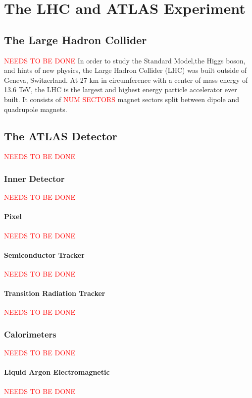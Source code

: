 \chapter{The LHC and ATLAS Experiment}

\section{The Large Hadron Collider}{
	\textcolor{red}{NEEDS TO BE DONE}
}
	In order to study the Standard Model,the Higgs boson, and hints of new physics, the Large Hadron Collider (LHC) was built outside of Geneva, Switzerland. At 27 km in circumference with a center of mass energy of 13.6 TeV, the LHC is the largest and highest energy particle accelerator ever built. It consists of \textcolor{red}{NUM SECTORS} magnet sectors split between dipole and quadrupole magnets.

\section{The ATLAS Detector}{
	\textcolor{red}{NEEDS TO BE DONE}  ~\cite{atlas-experiment}
}

	\subsection{Inner Detector}{
		\textcolor{red}{NEEDS TO BE DONE}
	}

		\subsubsection{Pixel}{
			\textcolor{red}{NEEDS TO BE DONE}
		}

		\subsubsection{Semiconductor Tracker}{
			\textcolor{red}{NEEDS TO BE DONE}
		}

		\subsubsection{Transition Radiation Tracker}{
			\textcolor{red}{NEEDS TO BE DONE}
		}

	\subsection{Calorimeters}{
		\textcolor{red}{NEEDS TO BE DONE}
	}

		\subsubsection{Liquid Argon Electromagnetic}{
			\textcolor{red}{NEEDS TO BE DONE}
		}

